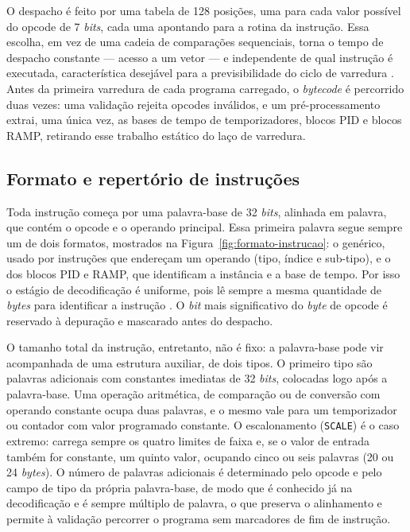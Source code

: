 O despacho é feito por uma tabela de 128 posições, uma para cada valor possível do opcode de 7 \textit{bits}, cada uma apontando para a rotina da instrução.
Essa escolha, em vez de uma cadeia de comparações sequenciais, torna o tempo de despacho constante --- acesso a um vetor --- e independente de qual instrução é executada, característica desejável para a previsibilidade do ciclo de varredura \cite{liu:2000,patterson:2020}.
Antes da primeira varredura de cada programa carregado, o \textit{bytecode} é percorrido duas vezes: uma validação rejeita opcodes inválidos, e um pré-processamento extrai, uma única vez, as bases de tempo de temporizadores, blocos PID e blocos RAMP, retirando esse trabalho estático do laço de varredura.

\subsection{Formato e repertório de instruções}
\label{sub:formato-repertorio}

Toda instrução começa por uma palavra-base de 32 \textit{bits}, alinhada em palavra, que contém o opcode e o operando principal.
Essa primeira palavra segue sempre um de dois formatos, mostrados na Figura~\ref{fig:formato-instrucao}: o genérico, usado por instruções que endereçam um operando (tipo, índice e sub-tipo), e o dos blocos PID e RAMP, que identificam a instância e a base de tempo.
Por isso o estágio de decodificação é uniforme, pois lê sempre a mesma quantidade de \textit{bytes} para identificar a instrução \cite{patterson:2020}.
O \textit{bit} mais significativo do \textit{byte} de opcode é reservado à depuração e mascarado antes do despacho.

O tamanho total da instrução, entretanto, não é fixo: a palavra-base pode vir acompanhada de uma estrutura auxiliar, de dois tipos.
O primeiro tipo são palavras adicionais com constantes imediatas de 32 \textit{bits}, colocadas logo após a palavra-base.
Uma operação aritmética, de comparação ou de conversão com operando constante ocupa duas palavras, e o mesmo vale para um temporizador ou contador com valor programado constante.
O escalonamento (\texttt{SCALE}) é o caso extremo: carrega sempre os quatro limites de faixa e, se o valor de entrada também for constante, um quinto valor, ocupando cinco ou seis palavras (20 ou 24 \textit{bytes}).
O número de palavras adicionais é determinado pelo opcode e pelo campo de tipo da própria palavra-base, de modo que é conhecido já na decodificação e é sempre múltiplo de palavra, o que preserva o alinhamento e permite à validação percorrer o programa sem marcadores de fim de instrução.

